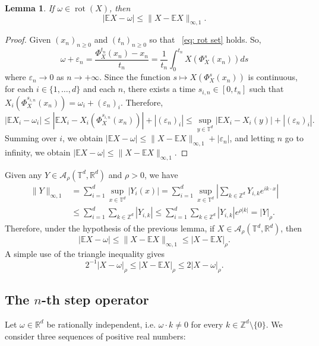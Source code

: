 \documentclass[12pt,reqno,a4paper]{amsart}%
\numberwithin{equation}{section}
\newtheorem{lemma}[theorem]{Lemma}
\newcommand{\Ee}{{\mathbb{E}}}
\newcommand{\Rr}{{\mathbb{R}}}
\newcommand{\Tt}{{\mathbb{T}}}
\newcommand{\Zz}{{\mathbb{Z}}}
\newcommand{\rot}{\operatorname{rot}}
\begin{document}
	\begin{lemma}%
	\label{lem:omega minus constant}
		If $\omega\in\rot(X)$, %
		then 
		$$
		|\Ee X-\omega|\leq  \|X-\Ee X\|_{\infty,1}.
		$$
	\end{lemma}
	\begin{proof}
Given $(x_n)_{n\geq0}$ and $(t_n)_{n\geq0}$ so that ~\eqref{eq: rot set} holds.
So,
\[
\omega+\varepsilon_n=\frac{\Phi^{t_n}_X(x_n)-x_n}{t_n}=\frac{1}{t_n}\int_0^{t_n}X(\Phi^s_X(x_n))ds
\]
where $\varepsilon_n\rightarrow 0$ as $n\to+\infty$. 
Since the function $s\mapsto X(\Phi^s_X(x_n))$ is continuous, for each $i\in\{1,\dots,d\}$ and each $n$, there exists a time $s_{i,n}\in[0,t_n]$ such that $X_i(\Phi^{s_{i,n}}_X(x_n))=\omega_i+(\varepsilon_n)_i$. Therefore,
		\[
		|\Ee X_i-\omega_i|\leq |\Ee X_i-X_i(\Phi^{s_{i,n}}_X(x_n))|+|(\varepsilon_n)_i|\leq \sup_{y\in\Tt^d}|\Ee X_i-X_i(y)|+|(\varepsilon_n)_i|.
		\]
Summing over $i$, we obtain $|\Ee X-\omega|\leq \|X-\Ee X\|_{\infty,1}+|\varepsilon_n|$, and letting $n$ go to infinity, we obtain $|\Ee X-\omega|\leq \|X-\Ee X\|_{\infty,1}$. 
	\end{proof}

\begin{remark}\label{rem:omega minus constant}
Given any $Y\in\mathcal A_{\rho}(\Tt^d,\Rr^d)$ and $\rho> 0$, we have
		\begin{align*}
			\|Y\|_{\infty,1}&=\sum_{i=1}^d\sup_{x\in\Tt^d}|Y_i(x)|=\sum_{i=1}^d\sup_{x\in\Tt^d}|\sum_{k\in\Zz^d}Y_{i,k}e^{ik\cdot x}|\\
			&\leq\sum_{i=1}^d\sum_{k\in\Zz^d}|Y_{i,k}|\leq \sum_{i=1}^d\sum_{k\in\Zz^d}|Y_{i,k}|e^{\rho|k|}
			=|Y|_{\rho}.
		\end{align*}
Therefore,  under the hypothesis of the previous lemma,  if  $X\in\mathcal A_{\rho}(\Tt^d,\Rr^d)$,  then 
$$
|\Ee X-\omega|\leq\|X-\Ee X\|_{\infty,1}\leq |X-\Ee X|_{\rho}.
$$
A simple use of the triangle inequality gives
$$
2^{-1}|X-\omega|_\rho \leq |X-\Ee X|_{\rho}\leq 2|X-\omega|_\rho.
$$
\end{remark}

\subsection{The $n$-th step operator}
Let $\omega\in\Rr^d$ be rationally independent, i.e. $\omega\cdot k\not=0$ for every $k\in\Zz^d\setminus\{0\}$.  We consider three sequences of positive real numbers:
\end{document}
